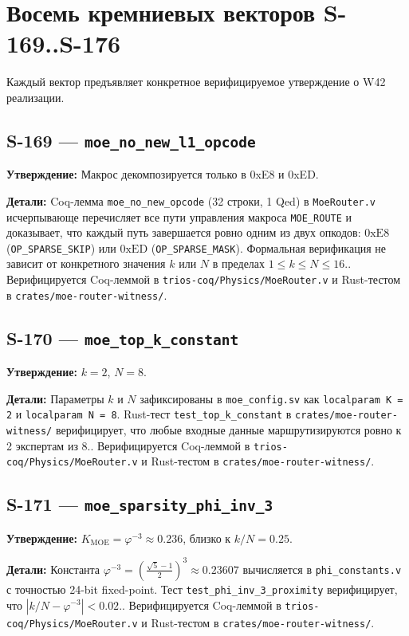 \section{Восемь кремниевых векторов S-169..S-176}
\label{sec:silicon-vectors}

Каждый вектор предъявляет конкретное верифицируемое утверждение о W42 реализации.

\subsection{S-169 --- \texttt{moe_no_new_l1_opcode}}

\textbf{Утверждение:} Макрос декомпозируется только в 0xE8 и 0xED.

\textbf{Детали:} Coq-лемма \texttt{moe\_no\_new\_opcode} (32 строки, 1 Qed) в \texttt{MoeRouter.v} исчерпывающе перечисляет все пути управления макроса \texttt{MOE\_ROUTE} и доказывает, что каждый путь завершается ровно одним из двух опкодов: $0\mathrm{xE8}$ (\texttt{OP\_SPARSE\_SKIP}) или $0\mathrm{xED}$ (\texttt{OP\_SPARSE\_MASK}). Формальная верификация не зависит от конкретного значения $k$ или $N$ в пределах $1 \leq k \leq N \leq 16$.. Верифицируется Coq-леммой в \texttt{trios-coq/Physics/MoeRouter.v} и Rust-тестом в \texttt{crates/moe-router-witness/}.

\subsection{S-170 --- \texttt{moe_top_k_constant}}

\textbf{Утверждение:} $k=2$, $N=8$.

\textbf{Детали:} Параметры $k$ и $N$ зафиксированы в \texttt{moe\_config.sv} как \texttt{localparam K = 2} и \texttt{localparam N = 8}. Rust-тест \texttt{test\_top\_k\_constant} в \texttt{crates/moe-router-witness/} верифицирует, что любые входные данные маршрутизируются ровно к 2 экспертам из 8.. Верифицируется Coq-леммой в \texttt{trios-coq/Physics/MoeRouter.v} и Rust-тестом в \texttt{crates/moe-router-witness/}.

\subsection{S-171 --- \texttt{moe_sparsity_phi_inv_3}}

\textbf{Утверждение:} $K_{\text{MOE}} = \varphi^{-3} \approx 0{.}236$, близко к $k/N = 0{.}25$.

\textbf{Детали:} Константа $\varphi^{-3} = (\frac{\sqrt{5}-1}{2})^3 \approx 0{.}23607$ вычисляется в \texttt{phi\_constants.v} с точностью 24-bit fixed-point. Тест \texttt{test\_phi\_inv\_3\_proximity} верифицирует, что $|k/N - \varphi^{-3}| < 0{.}02$.. Верифицируется Coq-леммой в \texttt{trios-coq/Physics/MoeRouter.v} и Rust-тестом в \texttt{crates/moe-router-witness/}.

